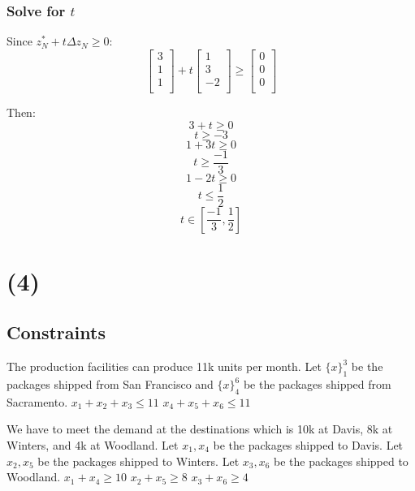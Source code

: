 \documentclass[14pt]{extarticle}
\begin{document}
\subsubsection*{Solve for $t$}
Since $z^*_N + t\Delta z_N \geq 0$:
\[
    \begin{bmatrix}
        3 \\
        1 \\
        1 \\
    \end{bmatrix}
    + t \begin{bmatrix}
        1 \\
        3 \\
        -2 \\
    \end{bmatrix}
    \geq \begin{bmatrix}
        0 \\
        0 \\
        0 \\
    \end{bmatrix}
\]

\bigskip Then:
\[
    3 + t \geq 0
\]
\[
    t \geq -3
\]
\[
    1 + 3t \geq 0
\]
\[
    t \geq \frac{-1}{3}
\]
\[
    1 - 2t \geq 0
\]
\[
    t \leq \frac{1}{2}
\]
\[
    t \in \left[\frac{-1}{3}, \frac{1}{2}\right]
\]

\section*{(4)}
\subsection*{Constraints}
The production facilities can produce 11k units per month. Let $\{x\}_1^3$ be the packages shipped from San Francisco and $\{x\}_4^6$ be the packages shipped from Sacramento.
\newline $x_1 + x_2 + x_3 \leq 11$
\newline $x_4 + x_5 + x_6 \leq 11$

\bigskip

We have to meet the demand at the destinations which is 10k at Davis, 8k at Winters, and 4k at Woodland. Let $x_1, x_4$ be the packages shipped to Davis. Let $x_2, x_5$ be the packages shipped to Winters. Let $x_3, x_6$ be the packages shipped to Woodland.
\newline $x_1 + x_4 \geq 10$
\newline $x_2 + x_5 \geq 8$
\newline $x_3 + x_6 \geq 4$
\end{document}
